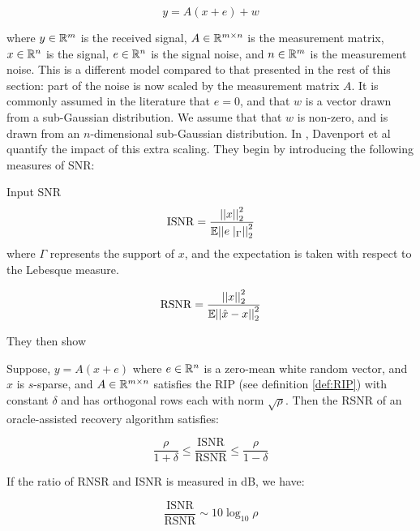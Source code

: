 \begin{equation}
y = A(x+e) + w 
\end{equation}

where \(y \in {\mathbb{R}}^m\) is the received signal, \(A \in {\mathbb{R}}^{m \times n}\) is the measurement matrix, \(x \in {\mathbb{R}}^n\) is the signal, \(e \in {\mathbb{R}}^n\) is the signal noise, and \(n \in {\mathbb{R}}^m\) is the measurement noise. This is a different model compared to that presented in the rest of this section: part of the noise is now scaled by the measurement matrix \(A\). It is commonly assumed in the literature that \(e = 0\), and that \(w\) is a vector drawn from a sub-Gaussian distribution. We assume that that \(w\) is non-zero, and is drawn from an \(n\)-dimensional sub-Gaussian distribution. In \cite{davenport2012pros}, Davenport et al quantify the impact of this extra scaling. They begin by introducing the following measures of SNR:

\begin{definition}{Input SNR}
\begin{equation}
\mathrm{ISNR} = \frac{\left|\left|x\right|\right|_2^2}{{\mathbb{E}}{\left|\left|e\mid_\Gamma\right|\right|}_2^2}
\end{equation}
where \(\Gamma\) represents the support of \(x\), and the expectation is taken with respect to the Lebesque measure.
\end{definition}

\begin{definition}
\begin{equation}
\mathrm{RSNR} = \frac{\left|\left|x\right|\right|_2^2}{{\mathbb{E}}{\left|\left|\hat{x}-x\right|\right|}_2^2}
\end{equation}
\end{definition}

They then show

\begin{theorem}
Suppose, \(y= A(x+e)\) where \(e \in {\mathbb{R}}^n\) is a zero-mean white random vector, and \(x\) is \(s\)-sparse, and \(A \in {\mathbb{R}}^{m \times n}\) satisfies the RIP (see definition \eqref{def:RIP}) with constant \(\delta\) and has orthogonal rows each with norm \(\sqrt{\rho}\). Then the RSNR of an oracle-assisted recovery algorithm satisfies:

\begin{equation}
\frac{\rho}{1+\delta} \leq \frac{\mathrm{ISNR}}{\mathrm{RSNR}} \leq \frac{\rho}{1-\delta}
\end{equation}

If the ratio of RNSR and ISNR is measured in dB, we have:

\begin{equation}
\frac{\mathrm{ISNR}}{\mathrm{RSNR}} \sim 10\log_{10}{\rho}
\end{equation}

\end{theorem}

